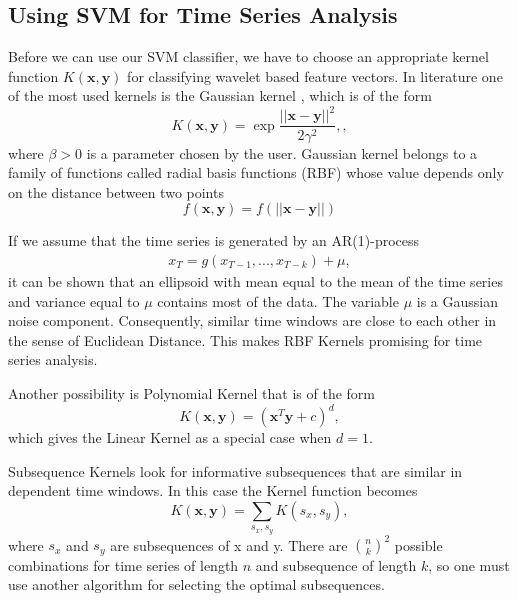 \subsection{Using SVM for Time Series Analysis}
Before we can use our SVM classifier, we have to choose an appropriate kernel function $K(\mathbf{x}, \mathbf{y})$ for classifying wavelet based feature vectors. In literature one of the most used kernels is the Gaussian kernel \cite{Zhang04}, which is of the form
\begin{equation}
K(\mathbf{x}, \mathbf{y}) = \exp{\frac{||\mathbf{x} - \mathbf{y}||^2}{2\gamma^2}}, \label{eq:RBF_kernel},
\end{equation}
where $\beta > 0$ is a parameter chosen by the user. Gaussian kernel belongs to a family of functions called radial basis functions (RBF) whose value depends only on the distance between two points \cite{Scholkopf97}
\begin{equation}
f(\mathbf{x}, \mathbf{y}) = f(||\mathbf{x} - \mathbf{y}||)
\end{equation}

If we assume that the time series is generated by an AR(1)-process 
\begin{align}
x_T = g(x_{T-1}, ..., x_{T-k}) + \mu,
\end{align}
it can be shown that an ellipsoid with mean equal to the mean of the time series and variance equal to $\mu$ contains most of the data. The variable $\mu$ is a Gaussian noise component. Consequently, similar time windows are close to each other in the sense of Euclidean Distance. This makes RBF Kernels promising for time series analysis. \cite{Ruping01}

Another possibility is Polynomial Kernel that is of the form
\begin{equation}
K(\mathbf{x}, \mathbf{y}) = (\mathbf{x}^T \mathbf{y} + c)^d,
\end{equation}
which gives the Linear Kernel as a special case when $d = 1$. \cite{Scholkopf97}

Subsequence Kernels look for informative subsequences that are similar in dependent time windows. In this case the Kernel function becomes
\begin{equation}
K(\mathbf{x}, \mathbf{y}) = \sum_{s_x, s_y} K (s_x, s_y),
\end{equation}
where $s_x$ and $s_y$ are subsequences of x and y. There are $\binom{n}{k}^2$ possible combinations for time series of length $n$ and subsequence of length $k$, so one must use another algorithm for selecting the optimal subsequences. \cite{Ruping01}

